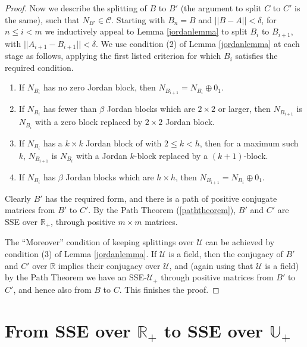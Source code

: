 \documentclass{amsart}
\theoremstyle{definition}
\theoremstyle{remark}
\numberwithin{equation}{section}
\begin{document}
{{\begin{proof}
Now we describe the splitting of $B$ to $B'$ 
(the argument to split $C$ to $C'$ is the same), 
such that $N_{B'}\in \mathcal C$. 
Starting with $B_n=B$ and $||B-A||<\delta$, 
for $n\leq i <m$ we inductively appeal to 
Lemma \ref{jordanlemma} to split $B_i$ to 
$B_{i+1}$, with $||A_{i+1}-B_{i+1}||<\delta $. 
We use condition (2) of
Lemma \ref{jordanlemma} at each stage as 
follows, applying the first listed criterion 
for which $B_i$ satisfies the required 
condition. 
\begin{enumerate} 
\item 
If $N_{B_i}$ has no zero Jordan block, 
then  $N_{B_{i+1}}=N_{B_i}\oplus 0_1$. 
\item 
If $N_{B_i}$ has fewer than $\beta $ 
Jordan blocks which are $2\times 2$ or larger, 
then 
$N_{B_{i+1}}$ is $ N_{B_i}$
with  a zero block 
replaced by $2\times 2$ Jordan block. 
\item 
If 
$N_{B_i}$ has 
 a $k\times k$ Jordan block of 
 with $2\leq k<h$, 
then for a maximum such $k$, 
$N_{B_{i+1}}$ is $ N_{B_i}$
with  a Jordan $k$-block 
replaced by a $(k+1)$-block. 
\item 
If $N_{B_i}$ has $\beta $ 
 Jordan blocks which are $h\times h$, 
then $N_{B_{i+1}}=N_{B_i}\oplus 0_1$. 
\end{enumerate} 
Clearly $B'$ has the required form, and there is a 
path of positive conjugate matrices from $B'$ to $C'$. 
 By the Path Theorem (\ref{paththeorem}),
$B'$ and $C'$ are SSE over $\mathbb R_+$, through 
positive $m\times m$ matrices. 

The ``Moreover'' condition of keeping splittings over 
$\mathcal U$ can be achieved by condition (3) 
of Lemma \ref{jordanlemma}. 
If $\mathcal U$ is a field, then the conjugacy of $B'$ and $C'$ over 
$\mathbb R$ implies their conjugacy over 
$\mathcal U$, and (again using that $\mathcal U$ 
is a field) by the Path Theorem we have an SSE-$\mathcal U_+$ 
through positive matrices from $B'$ to $C'$, and 
hence also from $B$ to $C$. This finishes the proof. 
\end{proof} 


\section{From SSE over $\mathbb R_+$ 
to SSE over $\mathbb U_+$} 
\label{sseoverplus}




}}
\end{document}
